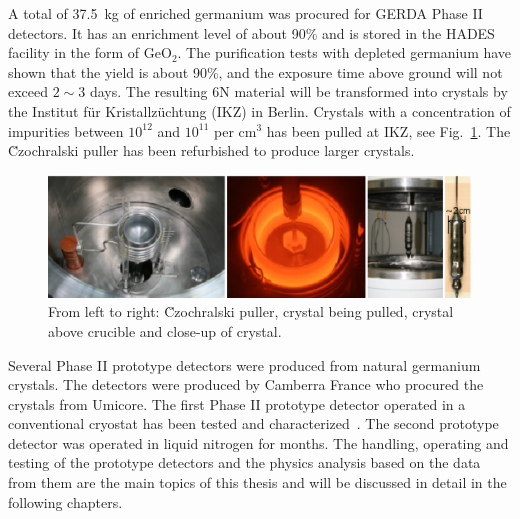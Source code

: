 A total of 37.5~kg of enriched germanium was procured for GERDA Phase II detectors. It has an enrichment level of about 90\% and is stored in the HADES facility in the form of GeO$_{2}$. The purification tests with depleted germanium have shown that the yield is about 90\%, and the exposure time above ground will not exceed $2 \sim 3$ days. The resulting 6N material will be transformed into crystals by the Institut f\"ur Kristallz\"uchtung (IKZ) in Berlin. Crystals with a concentration of impurities between $10^{12}$ and $10^{11}$ per cm$^{3}$ has been pulled at IKZ, see Fig.~\ref{fig:pulling}. The \u{C}zochralski puller has been refurbished to produce larger crystals.
\begin{figure}[tbhp]
  \centering
  \includegraphics[width=\textwidth]{crystalPulling}
  \caption{From left to right: \u{C}zochralski puller, crystal being pulled, crystal above crucible and close-up of crystal.}
  \label{fig:pulling}
\end{figure}

Several Phase II prototype detectors were produced from natural germanium crystals. The detectors were produced by Camberra France who procured the crystals from Umicore. The first Phase II prototype detector operated in a conventional cryostat has been tested and characterized~\cite{Sie07}. The second prototype detector was operated in liquid nitrogen for months. The handling, operating and testing of the prototype detectors and the physics analysis based on the data from them are the main topics of this thesis and will be discussed in detail in the following chapters.


